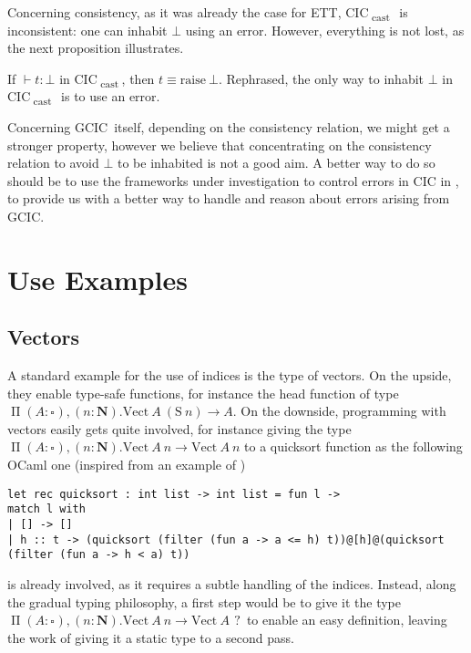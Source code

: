 \documentclass{kaobook}
\renewcommand{\mathtt}{\mathrm}
\newcommand{\uni}[1][]{\square_{#1}}
\newcommand{\conv}{\equiv}
\renewcommand{\P}{\operatorname{\Pi}}
\DeclareMathOperator{\?}{?}
\newcommand{\nat}{\mathbf{N}}
\newcommand{\s}{\mathtt{S}}
\newcommand{\ve}{\mathtt{Vect}}
\newcommand{\cas}{\operatorname{\mathtt{cast}}}
\newcommand{\rai}{\mathtt{raise}}
\newcommand{\gcic}{GCIC}
\newcommand{\cacic}{CIC\textsubscript{$\cas$}}
\newcommand{\ett}{ETT}
\begin{document}
{Concerning consistency, as it was already the case for \ett, \cacic\ is inconsistent: one can inhabit $\bot$ using an error. However, everything is not lost, as the next proposition illustrates.
\begin{prop}
	If $\vdash t : \bot$ in \cacic, then $t \conv \rai~\bot$. Rephrased, the only way to inhabit $\bot$ in \cacic\ is to use an error.
\end{prop}
Concerning \gcic\ itself, depending on the consistency relation, we might get a stronger property, however we believe that concentrating on the consistency relation to avoid $\bot$ to be inhabited is not a good aim. A better way to do so should be to use the frameworks under investigation to control errors in CIC in \cite{Pedrot2018, Pedrot2019}, to provide us with a better way to handle and reason about errors arising from \gcic.

\section{Use Examples}
\label{exs}


\subsection{Vectors}
\label{veexs}

A standard example for the use of indices is the type of vectors. On the upside, they enable type-safe functions, for instance the head function of type $\P (A : \uni), (n : \nat). \ve~A~(\s~n) \to A$. On the downside, programming with vectors easily gets quite involved, for instance giving the type $\P (A : \uni), (n : \nat). \ve~A~n \to \ve~A~n$ to a quicksort function as the following OCaml one (inspired from an example of \cite{Eremondi2019})
\begin{lstlisting}[language=caml]
let rec quicksort : int list -> int list = fun l ->
match l with
| [] -> []
| h :: t -> (quicksort (filter (fun a -> a <= h) t))@[h]@(quicksort (filter (fun a -> h < a) t))
\end{lstlisting}
is already involved, as it requires a subtle handling of the indices. Instead, along the gradual typing philosophy, a first step would be to give it the type $\P (A : \uni), (n : \nat). \ve~A~n \to \ve~A~\?$ to enable an easy definition, leaving the work of giving it a static type to a second pass.

}
\end{document}
